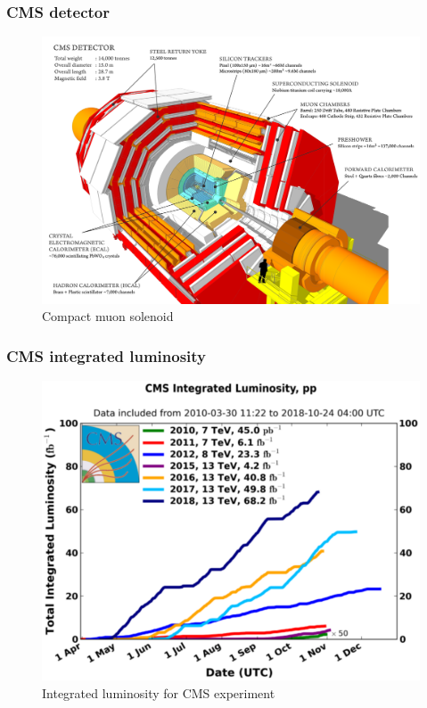 \documentclass[11pt]{beamer}
\begin{document}
\begin{frame}
\frametitle{CMS detector}
\begin{center}
	\begin{figure}
		\includegraphics[scale=0.08]{figures/cms.png}
		\caption{Compact muon solenoid}
	\end{figure}
\end{center}
\end{frame}

\begin{frame}
\frametitle{CMS integrated luminosity}
\begin{center}
	\begin{figure}
		\includegraphics[scale=0.23]{figures/cms_lumi.png}
		\caption{Integrated luminosity for CMS experiment }
	\end{figure}
\end{center}
\end{frame}
\end{document}
